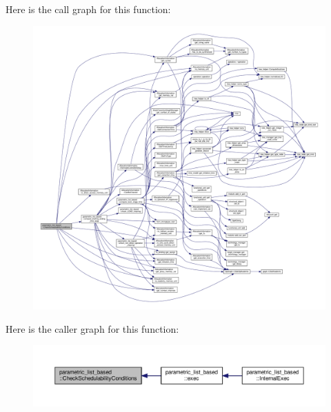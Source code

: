 Here is the call graph for this function\+:
\nopagebreak
\begin{figure}[H]
\begin{center}
\leavevmode
\includegraphics[width=350pt]{d7/d47/classparametric__list__based_a4ffd85836c234c7ded92b33e992f20bb_cgraph}
\end{center}
\end{figure}
Here is the caller graph for this function\+:
\nopagebreak
\begin{figure}[H]
\begin{center}
\leavevmode
\includegraphics[width=350pt]{d7/d47/classparametric__list__based_a4ffd85836c234c7ded92b33e992f20bb_icgraph}
\end{center}
\end{figure}
\mbox{\label{classparametric__list__based_a054abcf6ebfca65a3c67458cb77d7e63}} 
